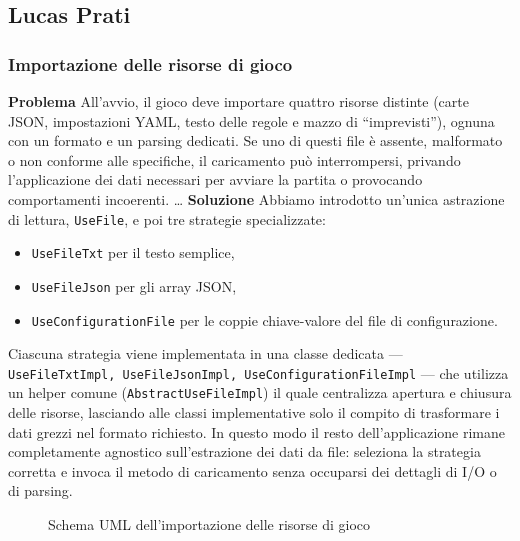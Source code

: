 \subsection{Lucas Prati}

\subsubsection{Importazione delle risorse di gioco}
\textbf{Problema}\newline
All'avvio, il gioco deve importare quattro risorse distinte 
(carte JSON, impostazioni YAML, testo delle regole e mazzo di “imprevisti”), ognuna con un formato e un parsing dedicati. 
Se uno di questi file è assente, malformato o non conforme alle specifiche, il caricamento può interrompersi, 
privando l'applicazione dei dati necessari per avviare la partita o provocando comportamenti incoerenti.
\dots\newline
\textbf{Soluzione}\newline
Abbiamo introdotto un'unica astrazione di lettura, \texttt{UseFile}, e poi tre strategie specializzate:\newline
\begin{itemize}
  \item \texttt{UseFileTxt} per il testo semplice,
  \item \texttt{UseFileJson} per gli array JSON,
  \item \texttt{UseConfigurationFile} per le coppie chiave-valore del file di configurazione.
\end{itemize}
Ciascuna strategia viene implementata in una classe dedicata — \texttt{UseFileTxtImpl, UseFileJsonImpl, UseConfigurationFileImpl} — 
che utilizza un helper comune (\texttt{AbstractUseFileImpl}) il quale centralizza apertura e chiusura delle risorse, 
lasciando alle classi implementative solo il compito di trasformare i dati grezzi nel formato richiesto.\newline
In questo modo il resto dell'applicazione rimane completamente agnostico sull'estrazione dei dati da file: 
seleziona la strategia corretta e invoca il metodo di caricamento senza occuparsi dei dettagli di I/O o di parsing.\newline
\begin{figure}[H]
    \centering
    \caption{Schema UML dell'importazione delle risorse di gioco}
	\label{img:UseFile}
\end{figure}

